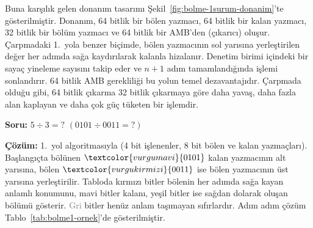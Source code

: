 Buna karşılık gelen donanım tasarımı Şekil~\ref{fig:bolme-1surum-donanim}'te gösterilmiştir. Donanım, 64 bitlik bir bölen yazmacı, 64 bitlik bir kalan yazmacı, 32 bitlik bir bölüm yazmacı ve 64 bitlik bir AMB'den (çıkarıcı) oluşur. Çarpmadaki 1.\ yola benzer biçimde, bölen yazmacının sol yarısına yerleştirilen değer her adımda sağa kaydırılarak kalanla hizalanır. Denetim birimi içindeki bir sayaç yineleme sayısını takip eder ve $n{+}1$ adım tamamlandığında işlemi sonlandırır. 64 bitlik AMB gerekliliği bu yolun temel dezavantajıdır. Çarpmada olduğu gibi, 64 bitlik çıkarma 32 bitlik çıkarmaya göre daha yavaş, daha fazla alan kaplayan ve daha çok güç tüketen bir işlemdir.

\begin{ornek}[5.10]
\textbf{Soru:} $5 \div 3 = ?$ \quad $(0101 \div 0011 = ?)$

\textbf{Çözüm:} 1.\ yol algoritmasıyla (4 bit işlenenler, 8 bit bölen ve kalan yazmaçları). Başlangıçta bölünen $\textcolor{vurgumavi}{0101}$ kalan yazmacının alt yarısına, bölen $\textcolor{vurgukirmizi}{0011}$ ise bölen yazmacının üst yarısına yerleştirilir. Tabloda \textcolor{vurgukirmizi}{kırmızı} bitler bölenin her adımda sağa kayan anlamlı konumunu, \textcolor{vurgumavi}{mavi} bitler kalanı, \textcolor{vurguyesil}{yeşil} bitler ise sağdan dolarak oluşan bölümü gösterir. \textcolor{gray}{Gri} bitler henüz anlam taşımayan sıfırlardır. Adım adım çözüm Tablo~\ref{tab:bolme1-ornek}'de gösterilmiştir.


\end{ornek}

